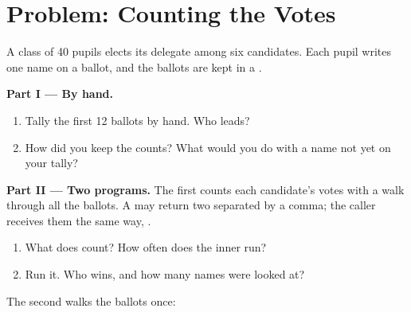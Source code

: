 \section{Problem: Counting the Votes}

\begin{problem}\label{pb:g8:dictionaries:1}
A class of 40 pupils elects its delegate among six candidates. Each pupil
writes one name on a ballot, and the ballots are kept in a .

\label{lst:g8:dictionaries:ballots}

\medskip\noindent\textbf{Part I --- By hand.}
\begin{enumerate}
  \item Tally the first 12 ballots by hand. Who leads?
  \item How did you keep the counts? What would you do with a name not yet on
    your tally?
\end{enumerate}

\medskip\noindent\textbf{Part II --- Two programs.} The first  counts
each candidate's votes with a walk through all the ballots. A  may
return two  separated by a comma; the caller receives them the same
way, .

\label{lst:g8:dictionaries:votes-list}

\begin{enumerate}[resume]
  \item What does  count? How often does the inner  run?
  \item Run it. Who wins, and how many names were looked at?
\end{enumerate}

The second  walks the ballots once:

\label{lst:g8:dictionaries:votes-dict}


\end{problem}
